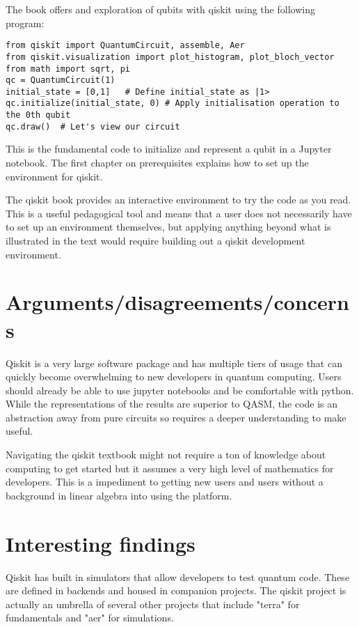 \documentclass{article}
\begin{document}
The book offers and exploration of qubits with qiskit using the following program:
\begin{lstlisting}
from qiskit import QuantumCircuit, assemble, Aer
from qiskit.visualization import plot_histogram, plot_bloch_vector
from math import sqrt, pi
qc = QuantumCircuit(1)
initial_state = [0,1]   # Define initial_state as |1>
qc.initialize(initial_state, 0) # Apply initialisation operation to the 0th qubit
qc.draw()  # Let's view our circuit
\end{lstlisting}
This is the fundamental code to initialize and represent a qubit in a Jupyter notebook. The first chapter on prerequisites explains how to set up the environment for qiskit.

The qiskit book provides an interactive environment to try the code as you read. This is a useful pedagogical tool and means that a user does not necessarily have to set up an environment themselves, but applying anything beyond what is illustrated in the text would require building out a qiskit development environment.



\section{Arguments/disagreements/concerns}

Qiskit is a very large software package and has multiple tiers of usage that can quickly become overwhelming to new developers in quantum computing. Users should already be able to use jupyter notebooks and be comfortable with python. While the representations of the results are superior to QASM, the code is an abstraction away from pure circuits so requires a deeper understanding to make useful.

Navigating the qiskit textbook might not require a ton of knowledge about computing to get started but it assumes a very high level of mathematics for developers. This is a impediment to getting new users and users without a background in linear algebra into using the platform. 

\section{Interesting findings}
Qiskit has built in simulators that allow developers to test quantum code. These are defined in backends and housed in companion projects. The qiskit project is actually an umbrella of several other projects that include "terra" for fundamentals and "aer" for simulations.
\end{document}
